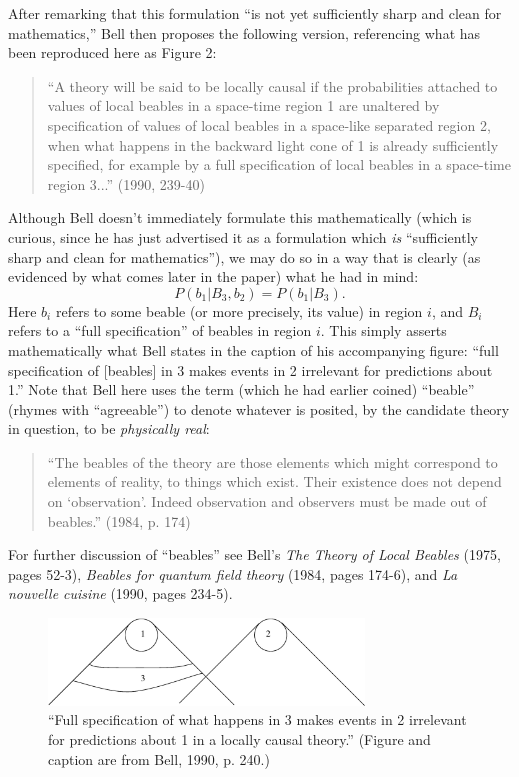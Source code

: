 \documentclass[12pt]{article}
\begin{document}
After remarking that this formulation ``is not yet sufficiently sharp
and clean for mathematics,'' Bell then proposes the following 
version, referencing what has been reproduced here as Figure 2:
\begin{quote}
``A theory will be said to be locally causal if the probabilities
attached to values of local beables in a space-time region 1 are
unaltered by specification of values of local beables in a space-like
separated region 2, when what happens in the backward light cone of 1
is already sufficiently specified, for example by a full specification
of local beables in a space-time region 3...'' (1990, 239-40)
\end{quote}
Although Bell doesn't immediately formulate this mathematically (which
is curious, since he has just advertised it as a formulation which
\emph{is} ``sufficiently sharp and clean for mathematics''), we may do
so in a way that is clearly (as evidenced by what comes later in the
paper) what he had in mind:
\begin{equation}
P(b_1 | B_3, b_2) = P(b_1 | B_3).
\label{eq:loc}
\end{equation}
Here $b_i$ refers to some beable (or more precisely, its value) 
in region $i$, and $B_i$ refers to a
``full specification'' of beables in region $i$.  This simply asserts 
mathematically what Bell states in the caption of his
accompanying figure:  ``full specification of [beables] in 3 makes 
events in 2 irrelevant for predictions about 1.''  
Note that Bell here uses the term (which he had earlier coined)
``beable'' (rhymes with ``agreeable'')
to denote whatever is posited, by the candidate theory in question, 
to be \emph{physically real}:  
\begin{quote}
``The beables of the theory are those elements which might
correspond to elements of reality, to things which exist.  Their 
existence does not depend on `observation'.  Indeed observation
and observers must be made out of beables.'' (1984, p. 174)
\end{quote}
For further discussion of ``beables'' see Bell's \emph{The Theory of
  Local Beables} (1975, pages 52-3), \emph{Beables for quantum field
  theory} (1984, pages 174-6), and \emph{La nouvelle cuisine} (1990,
  pages 234-5).  



\begin{figure}[t]
\begin{center}
\includegraphics[width=3.3in,clip]{./fig2.eps}
\end{center}
\caption{
\label{fig2}
``Full specification of what happens in 3 makes events in 2 irrelevant
for predictions about 1 in a locally causal theory.''  
(Figure and caption are from Bell, 1990, p. 240.)
}
\end{figure}
\end{document}
